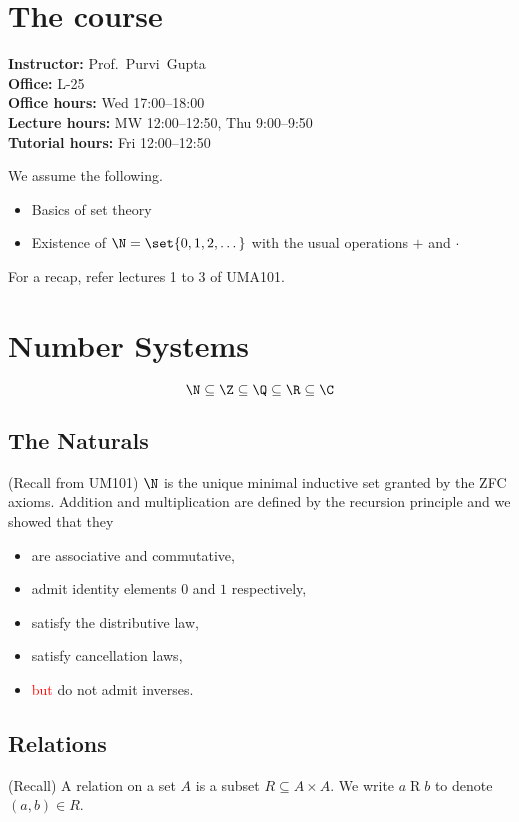 
\chapter*{The course} \label{chp:course}
\textbf{Instructor:} Prof.~Purvi~Gupta\\
\textbf{Office:} L-25\\
\textbf{Office hours:} Wed 17:00--18:00\\
\textbf{Lecture hours:} MW 12:00--12:50, Thu 9:00--9:50\\
\textbf{Tutorial hours:} Fri 12:00--12:50

We assume the following.
\begin{itemize}
    \item Basics of set theory
    \item Existence of $\N = \set{0, 1, 2, \dots}$ with the usual operations
    $+$ and $\cdot$
\end{itemize}
For a recap, refer lectures 1 to 3 of UMA101.

\chapter{Number Systems} \label{chp:number_systems}
\[
    \N \subseteq \Z \subseteq \Q \subseteq \R \subseteq \C
\]
\section{The Naturals} \label{sec:naturals}
(Recall from UM101) $\N$ is the unique minimal inductive set granted by the ZFC
axioms.
Addition and multiplication are defined by the recursion principle and we showed
that they
\begin{itemize}
    \item are associative and commutative,
    \item admit identity elements $0$ and $1$ respectively,
    \item satisfy the distributive law,
    \item satisfy cancellation laws,
    \item \textcolor{Red}{but} do not admit inverses.
\end{itemize}

\section{Relations} \label{sec:relations}
(Recall) A relation on a set $A$ is a subset $R \subseteq A \times A$.
We write $a \mathrel{R} b$ to denote $(a, b) \in R$.


